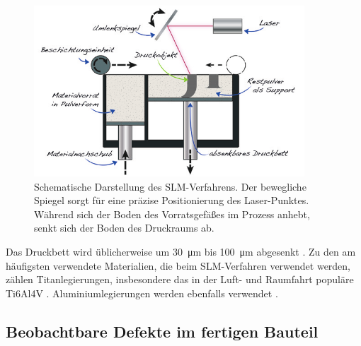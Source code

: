 		\begin{figure}[!ht]
			\centering
			\includegraphics[width=0.9\textwidth]{chapter/main/img/sls_slm.png}
			\caption[Schematische Darstellung des SLM-Verfahrens]{Schematische Darstellung des
			SLM-Verfahrens. Der bewegliche Spiegel sorgt für eine präzise Positionierung des
			Laser-Punktes. Während sich der Boden des Vorrats\-gefäßes im Prozess anhebt, senkt
			sich der Boden des Druckraums ab. \cite[S. 119]{horsch20143d}}
			\label{fig:slm_sls}
		\end{figure}

		Das Druckbett wird üblicherweise um \SI{30}{\micro\meter} bis \SI{100}{\micro\meter}
		abgesenkt \cite{song2012effects}. Zu den am häufigsten verwendete Materialien, die beim
		SLM-Verfahren verwendet werden, zählen Titanlegierungen, insbesondere das in der Luft- und
		Raumfahrt populäre Ti6Al4V \cite{song2012effects,shi2016performance,brandl2012morphology}. %
		Aluminiumlegierungen werden ebenfalls verwendet
		\cite[je Al-Si-10Mg]{yan2020comparative,zou2017study}.

	\subsection{Beobachtbare Defekte im fertigen Bauteil}
